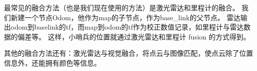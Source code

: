最常见的融合方法（也是我们现在使用的方法）是激光雷达和里程计的融合。
我们新建一个节点Odom，他作为map的子节点，作为base\_link的父节点。
雷达输出odom到baselink的tf，而map到odom的tf作为校正数值记录，如里程计与雷达数据的偏差等。
这样，小哨兵的位置就通过激光雷达和里程计 fusion 的方式得到。

其他的融合方法还有：激光雷达与视觉融合，将点云与图像匹配，使点云除了位置信息外，还能拥有颜色等信息。
